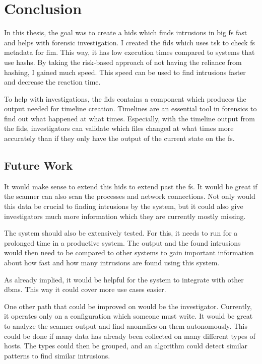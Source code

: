 
\chapter{Conclusion}
\label{sec:Conclusion}
In this thesis, the goal was to create a \gls{hids} which finds \glspl{intrusion} in big \gls{fs} fast and helps with forensic investigation. I created the \gls{fids} which uses \gls{tsk} to check \gls{fs} \gls{metadata} for \gls{fim}. This way, it has low execution times compared to systems that use \glspl{hash}. By taking the risk-based approach of not having the reliance from hashing, I gained much speed. This speed can be used to find \glspl{intrusion} faster and decrease the reaction time. 

To help with investigations, the \gls{fids} contains a component which produces the output needed for timeline creation. Timelines are an essential tool in forensics to find out what happened at what times. Especially, with the timeline output from the \gls{fids}, investigators can validate which files changed at what times more accurately than if they only have the output of the current state on the \gls{fs}. 

\section{Future Work}
\label{sec:future:work}


It would make sense to extend this \gls{hids} to extend past the \gls{fs}. It would be great if the scanner can also scan the processes and network connections. Not only would this data be crucial to finding \glspl{intrusion} by the system, but it could also give investigators much more information which they are currently mostly missing.

The system should also be extensively tested. For this, it needs to run for a prolonged time in a productive system. The output and the found \glspl{intrusion} would then need to be compared to other systems to gain important information about how fast and how many \glspl{intrusion} are found using this system. 

As already implied, it would be helpful for the system to integrate with other \gls{dbms}. This way it could cover more use cases easier. 

One other path that could be improved on would be the investigator. Currently, it operates only on a configuration which someone must write. It would be great to analyze the scanner output and find anomalies on them autonomously. This could be done if many data has already been collected on many different types of hosts. The types could then be grouped, and an algorithm could detect similar patterns to find similar \glspl{intrusion}. 
